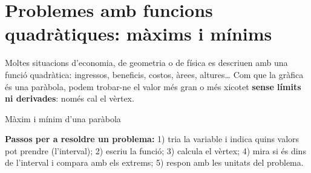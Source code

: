 \documentclass[11pt,a4paper]{article}
\makeatletter
\newcommand{\lt}{<}\newcommand{\gt}{>}
\newcommand{\fmm}[1]{\setbox0=\hbox{$#1$}\ifdim\wd0>0.8\linewidth\def\fmmnext{\fmmdisp{#1}}\else\def\fmmnext{\mbox{\box0}}\fi\fmmnext}
\def\fmmdisp#1{\@ifnextchar.{\fmmdispp{#1}}{\@ifnextchar,{\fmmdispc{#1}}{\@ifnextchar;{\fmmdisps{#1}}{\fmdisp{#1}}}}}
\def\fmmdispp#1.{\fmdisp{#1\,.}}\def\fmmdispc#1,{\fmdisp{#1\,,}}\def\fmmdisps#1;{\fmdisp{#1\,;}}
\newcommand{\fmdisp}[1]{\[\setbox2=\hbox{$\displaystyle #1$}\ifdim\wd2>\linewidth\resizebox{\linewidth}{!}{\box2}\else\box2\fi\]}
\makeatother
\begin{document}
\Needspace{6.2cm}
\section{Problemes amb funcions quadràtiques: màxims i mínims}\hypertarget{sec8}{}

Moltes situacions d'economia, de geometria o de física es descriuen amb una funció quadràtica: ingressos, beneficis, costos, àrees, altures\dots{} Com que la gràfica és una paràbola, podem trobar-ne el valor més gran o més xicotet \textbf{sense límits ni derivades}: només cal el vèrtex.

\begin{fmdef}{Màxim i mínim d'una paràbola}

\textbf{Passos per a resoldre un problema:} 1) tria la variable i indica quins valors pot prendre (l'interval); 2) escriu la funció; 3) calcula el vèrtex; 4) mira si és dins de l'interval i compara amb els extrems; 5) respon amb les unitats del problema.
\end{fmdef}
\end{document}
